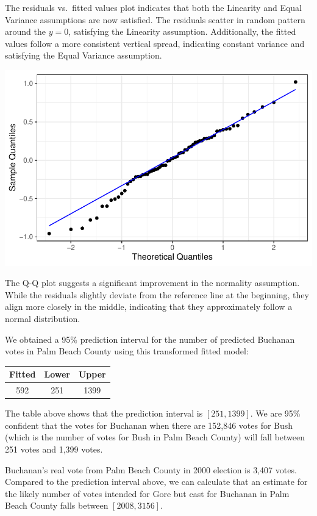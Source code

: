 \documentclass[
  letterpaper,
  DIV=11,
  numbers=noendperiod]{scrartcl}
\begin{document}
The residuals vs.~fitted values plot indicates that both the Linearity
and Equal Variance assumptions are now satisfied. The residuals scatter
in random pattern around the \(y = 0\), satisfying the Linearity
assumption. Additionally, the fitted values follow a more consistent
vertical spread, indicating constant variance and satisfying the Equal
Variance assumption.

\includegraphics{SDS-291-case-study-1_files/figure-pdf/unnamed-chunk-9-1.pdf}

The Q-Q plot suggests a significant improvement in the normality
assumption. While the residuals slightly deviate from the reference line
at the beginning, they align more closely in the middle, indicating that
they approximately follow a normal distribution.

We obtained a 95\% prediction interval for the number of predicted
Buchanan votes in Palm Beach County using this transformed fitted model:

\begin{table}[H]
\centering
\begin{tabular}[t]{ccc}
\toprule
Fitted & Lower & Upper\\
\midrule
592 & 251 & 1399\\
\bottomrule
\end{tabular}
\end{table}

The table above shows that the prediction interval is \([251, 1399]\).
We are 95\% confident that the votes for Buchanan when there are 152,846
votes for Bush (which is the number of votes for Bush in Palm Beach
County) will fall between 251 votes and 1,399 votes.

Buchanan's real vote from Palm Beach County in 2000 election is 3,407
votes. Compared to the prediction interval above, we can calculate that
an estimate for the likely number of votes intended for Gore but cast
for Buchanan in Palm Beach County falls between \([2008, 3156]\).
\end{document}
